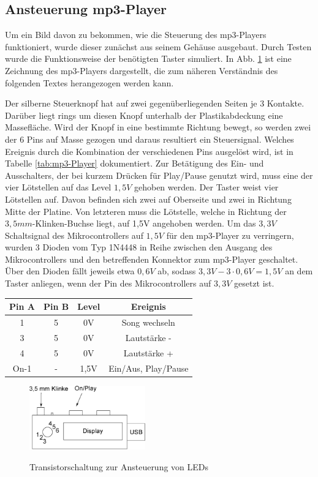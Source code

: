 \documentclass[journal, a4paper]{IEEEtran}
\begin{document}
	\subsection{Ansteuerung mp3-Player}
		\label{sc:Hardware:subsc:mp3-Player}
		Um ein Bild davon zu bekommen, wie die Steuerung des mp3-Players funktioniert, wurde dieser zunächst aus seinem Gehäuse ausgebaut. Durch Testen wurde die Funktionsweise der benötigten Taster simuliert.  In Abb. \ref{fig:mp3-Player} ist eine Zeichnung des mp3-Players dargestellt, die zum näheren Verständnis des folgenden Textes herangezogen werden kann.\par 
		Der silberne Steuerknopf hat auf zwei gegenüberliegenden Seiten je 3 Kontakte. Darüber liegt rings um diesen Knopf unterhalb der Plastikabdeckung eine Massefläche. Wird der Knopf in eine bestimmte Richtung bewegt, so werden zwei der 6 Pins auf Masse gezogen und daraus resultiert ein Steuersignal. Welches Ereignis durch die Kombination der verschiedenen Pins ausgelöst wird, ist in Tabelle \ref{tab:mp3-Player} dokumentiert. Zur Betätigung des Ein- und Ausschalters, der bei kurzem Drücken für Play/Pause genutzt wird, muss eine der vier Lötstellen auf das Level $1,5V$ gehoben werden. Der Taster weist vier Lötstellen auf. Davon befinden sich zwei auf Oberseite und zwei in Richtung Mitte der Platine. Von letzteren muss die Lötstelle, welche in Richtung der $3,5mm$-Klinken-Buchse liegt, auf 1,5V angehoben werden. Um das $3,3V$ Schaltsignal des Mikrocontrollers auf $1,5V$ für den mp3-Player zu verringern, wurden 3 Dioden vom Typ 1N4448 in Reihe zwischen den Ausgang des Mikrocontrollers und den betreffenden Konnektor zum mp3-Player geschaltet. Über den Dioden fällt jeweils etwa $0,6V$ ab, sodass $3,3V-3\cdot0,6V = 1,5V$ an dem Taster anliegen, wenn der Pin des Mikrocontrollers auf $3,3V$ gesetzt ist.
		\begin{center}
			\begin{tabular}{cccc}
				\toprule
				Pin A & Pin B & Level & Ereignis \\
				\midrule
				1 & 5 & 0V & Song wechseln\\
				3 & 5 & 0V & Lautstärke -\\
				4 & 5 & 0V & Lautstärke +\\
				On-1 & -& 1,5V & Ein/Aus, Play/Pause\\
				\bottomrule		
			\end{tabular}
			\label{tab:mp3-Player}
		\end{center}
		\begin{figure}
			\begin{center}
				\label{fig:mp3-Player}
				\includegraphics[width=5cm]{./Grafiken/mp3Player.eps}
				\caption{Transistorschaltung zur Ansteuerung von LEDs}
			\end{center}
		\end{figure}	
\end{document}
